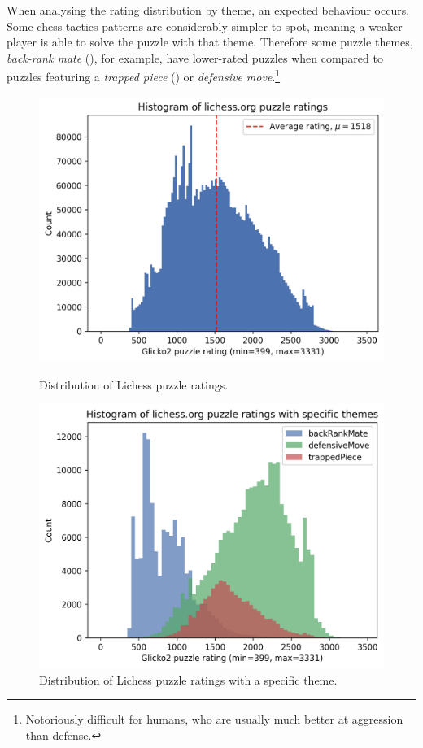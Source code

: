 When analysing the rating distribution by theme, an expected behaviour occurs.
Some chess tactics patterns are considerably simpler to spot, meaning a weaker
player is able to solve the puzzle with that theme. Therefore some puzzle
themes, \emph{back-rank mate} (), for example, have lower-rated
puzzles when compared to puzzles featuring a \emph{trapped piece}
() or \emph{defensive move}.\footnote{Notoriously difficult for
humans, who are usually much better at aggression than
defense.\footnotemark}

\begin{figure}[H]
  \begin{minipage}[t]{0.475\textwidth}
    \centering
    \includegraphics[width=\textwidth]{project/img/puzzle_histogram.png}
    \caption{Distribution of Lichess puzzle ratings.}
    \label{dataHistogram}
  \end{minipage}
  \hspace{0.05\textwidth}
  \begin{minipage}[t]{0.475\textwidth}
    \centering
    \includegraphics[width=\textwidth]
    {project/img/puzzle_theme_histograms.png}
    \caption{Distribution of Lichess puzzle ratings with a specific theme.}
    \label{dataThemeHistogram}
  \end{minipage}
\end{figure}

